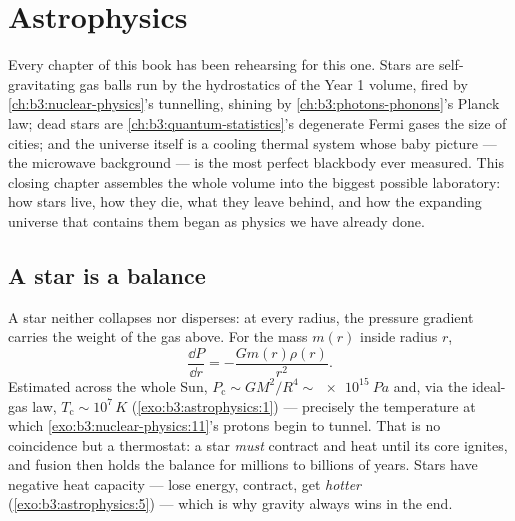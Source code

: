 \chapter{Astrophysics}\label{ch:b3:astrophysics}


Every chapter of this book has been rehearsing for this one. Stars
are self-gravitating gas balls run by the hydrostatics of the Year 1
volume, fired by \cref{ch:b3:nuclear-physics}'s tunnelling, shining
by \cref{ch:b3:photons-phonons}'s Planck law; dead stars are
\cref{ch:b3:quantum-statistics}'s degenerate Fermi gases the size of
cities; and the universe itself is a cooling thermal system whose
baby picture --- the microwave background --- is the most perfect
blackbody ever measured. This closing chapter assembles the whole
volume into the biggest possible laboratory: how stars live, how
they die, what they leave behind, and how the expanding universe
that contains them began as physics we have already done.

\section{A star is a balance}

\begin{proposition}\label{prop:b3:astrophysics:hydrostatic}
A star neither collapses nor disperses: at every radius, the
pressure gradient carries the weight of the gas above. For the
mass $m(r)$ inside radius $r$,
\[
\frac{\dd P}{\dd r} = -\frac{Gm(r)\rho(r)}{r^2} .
\]
Estimated across the whole Sun, $P_{\text{c}} \sim GM^2/R^4 \sim
\qty{e15}{Pa}$ and, via the ideal-gas law, $T_{\text{c}} \sim
10^7\,\unit{K}$ (\cref{exo:b3:astrophysics:1}) --- precisely the
temperature at which \cref{exo:b3:nuclear-physics:11}'s protons
begin to tunnel. That is no coincidence but a thermostat: a star
\emph{must} contract and heat until its core ignites, and fusion
then holds the balance for millions to billions of years. Stars
have negative heat capacity --- lose energy, contract, get
\emph{hotter} (\cref{exo:b3:astrophysics:5}) --- which is why
gravity always wins in the end.
\end{proposition}

